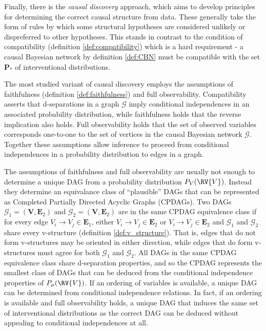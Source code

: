 Finally, there is the \emph{causal discovery} approach, which aims to develop principles for determining the correct causal structure from data. These generally take the form of rules by which some structural hypotheses are considered unlikely or dispreferred to other hypotheses. This stands in contrast to the condition of compatibility (definition \ref{def:compatibility}) which is a hard requirement - a causal Bayesian network by definition \ref{def:CBN} must be compatible with the set $\mathbf{P}_*$ of interventional distributions.


The most studied variant of causal discovery employs the assumptions of faithfulness (definition \ref{def:faithfulness}) and full observability. Compatibility asserts that d-separations in a graph $\mathcal{G}$ imply conditional independences in an associated probability distribution, while faithfulness holds that the reverse implication also holds. Full observability holds that the set of observed variables corresponds one-to-one to the set of vertices in the causal Bayesian network $\mathcal{G}$. Together these assumptions allow inference to proceed from conditional independences in a probability distribution to edges in a graph.

The assumptions of faithfulness and full observability are usually not enough to determine a unique DAG from a probability distribution $P_V(\RV{V})$. Instead they determine an equivalance class of ``plausible'' DAGs that can be represented as Completed Partially Directed Acyclic Graphs (CPDAGs). Two DAGs $\mathcal{G}_1=(\mathbf{V},\mathbf{E}_2)$ and $\mathcal{G}_2=(\mathbf{V},\mathbf{E}_2)$ are in the same CPDAG equivalence class if for every edge $V_i\to V_j\in \mathbf{E}_1$, either $V_i\to V_j\in \mathbf{E}_2$ or $V_i\to V_j\in \mathbf{E}_2$ and $\mathcal{G}_1$ and $\mathcal{G}_2$ share every v-structure (definition \ref{def:v_structure})\cite{pearl_causality:_2009}. That is, edges that do not form v-structures may be oriented in either direction, while edges that do form v-structures must agree for both $\mathcal{G}_1$ and $\mathcal{G}_2$. All DAGs in the same CPDAG equivalence class share d-separation properties, and so the CPDAG represents the smallest class of DAGs that can be deduced from the conditional independence properties of $P_\mu(\RV{V})$. If an ordering of variables is available, a unique DAG can be determined from conditional independence relations\cite{spirtes_algorithm_1991}. In fact, if an ordering is available and full observability holds, a unique DAG that induces the same set of interventional distributions as the correct DAG can be deduced without appealing to conditional independences at all\cite{peters_structural_2013,bareinboim_local_2012}.

